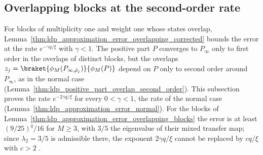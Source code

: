 
\subsection{Overlapping blocks at the second-order rate}
\label{sec:ldp_overlapping_second_order}

For blocks of multiplicity one and weight one whose states overlap,
Lemma~\ref{thm:ldp_approximation_error_overlapping_corrected} bounds the error at the
rate $e^{-\gamma q/\xi}$ with $\gamma<1$. The positive part $P$ converges to $P_\infty$
only to first order in the overlaps of distinct blocks, but the overlaps
$z_j=\braket{\phi_M(P_{\infty,\tilde\rho_j})}{\phi_M(P)}$ depend on $P$ only to second order
around $P_\infty$, as in the normal case
(Lemma~\ref{thm:ldp_positive_part_overlap_second_order}). This subsection proves the rate
$e^{-2\gamma q/\xi}$ for every $0<\gamma<1$, the rate of the normal case
(Lemma~\ref{thm:ldp_approximation_error_normal}). For the blocks of
Lemma~\ref{thm:ldp_approximation_error_overlapping_blocks} the error is at least
$(9/25)^q/16$ for $M\geq3$, with $3/5$ the eigenvalue of their mixed transfer map; since
$\lambda_2=3/5$ is admissible there, the exponent $2\gamma q/\xi$ cannot be replaced by $cq/\xi$
with $c>2$ \cite{gap:mswc24_block_form_mixed_overlap}.


